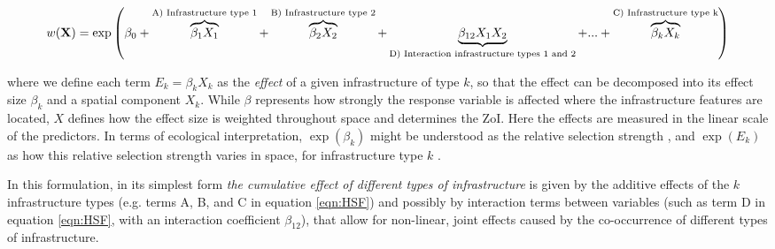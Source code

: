 \documentclass[titlepage]{article}
\begin{document}
{\begin{equation}
\centering
\label{eqn:HSF}
    w(\textbf{X}) %
                  = \exp \left( \beta_0 + \overbrace{\beta_1 X_1}^\text{A) Infrastructure type 1} + \overbrace{\beta_2 X_2}^\text{B) Infrastructure type 2} + \underbrace{\beta_{12} X_1 X_2}_\text{D) Interaction infrastructure types 1 and 2} + ... + \overbrace{\beta_k X_k}^\text{C) Infrastructure type k} \right)
\end{equation}

where we define each term $E_k = \beta_k X_k$ as the \textit{effect} of a given infrastructure of type $k$, so that the effect can be decomposed into its effect size $\beta_k$ and a spatial component $X_k$. While $\beta$ represents how strongly the response variable is affected where the infrastructure features are located, $X$ defines how the effect size is weighted throughout space and determines the ZoI. Here the effects are measured in the linear scale of the predictors. In terms of ecological interpretation, $\exp(\beta_k)$ might be understood as the relative selection strength \citep{avgar_relative_2017}, and $\exp(E_k)$ as how this relative selection strength varies in space, for infrastructure type $k$ \citep{fieberg_how_2021}.

In this formulation, in its simplest form \textit{the cumulative effect of different types of infrastructure} is given by the additive effects of the $k$ infrastructure types (e.g. terms A, B, and C in equation \ref{eqn:HSF}) and possibly by interaction terms between variables (such as term D in equation \ref{eqn:HSF}, with an interaction coefficient $\beta_{12}$), that allow for non-linear, joint effects caused by the co-occurrence of different types of infrastructure. 

}
\end{document}
